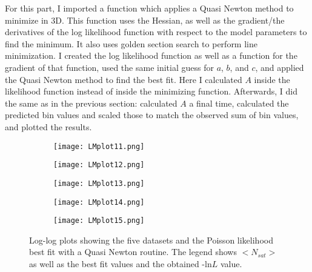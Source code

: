 For this part, I imported a function which applies a Quasi Newton method to minimize in 3D. 
This function uses the Hessian, as well as the gradient/the derivatives of the log likelihood function with respect to the model parameters to find the minimum. 
It also uses golden section search to perform line minimization.
I created the log likelihood function as well as a function for the gradient of that function, used the same initial guess for $a$, $b$, and $c$, and applied the Quasi Newton method to find the best fit.
Here I calculated $A$ inside the likelihood function instead of inside the minimizing function.
Afterwards, I did the same as in the previous section: calculated $A$ a final time, calculated the predicted bin values and scaled those to match the observed sum of bin values, and plotted the results.

\begin{figure}[ht!]
\begin{center}
        \begin{subfigure}{.49\textwidth}
      \centering
      \texttt{[image: LMplot11.png]}
    \end{subfigure}
    \vspace{-10pt}
    \begin{subfigure}{.49\textwidth}
      \centering
      \texttt{[image: LMplot12.png]} 
    \end{subfigure}
     \vspace{-10pt}
    \begin{subfigure}{.49\textwidth}
      \centering
      \texttt{[image: LMplot13.png]} 
    \end{subfigure}
     \vspace{-10pt}
    \begin{subfigure}{.49\textwidth}
      \centering
      \texttt{[image: LMplot14.png]} 
    \end{subfigure}
     \vspace{-10pt}
    \begin{subfigure}{.49\textwidth}
      \centering
      \texttt{[image: LMplot15.png]} 
    \end{subfigure}
    \caption{Log-log plots showing the five datasets and the Poisson likelihood best fit with a Quasi Newton routine. The legend shows $<N_{sat}>$ as well as the best fit values and the obtained -ln$L$ value.}
    \label{fig:QNfit}
\end{center}
\end{figure}

